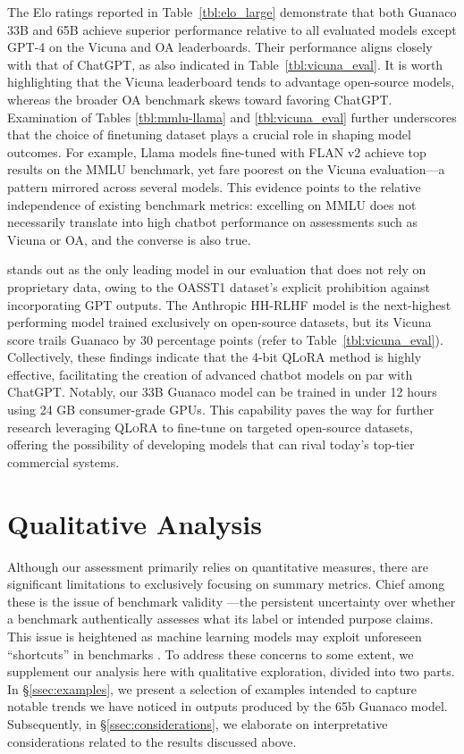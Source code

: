 The Elo ratings reported in Table~\ref{tbl:elo_large} demonstrate that both {Guanaco} 33B and 65B achieve superior performance relative to all evaluated models except GPT-4 on the Vicuna and OA leaderboards. Their performance aligns closely with that of ChatGPT, as also indicated in Table~\ref{tbl:vicuna_eval}. It is worth highlighting that the Vicuna leaderboard tends to advantage open-source models, whereas the broader OA benchmark skews toward favoring ChatGPT. Examination of Tables \ref{tbl:mmlu-llama} and \ref{tbl:vicuna_eval} further underscores that the choice of finetuning dataset plays a crucial role in shaping model outcomes. For example, Llama models fine-tuned with FLAN v2 achieve top results on the MMLU benchmark, yet fare poorest on the Vicuna evaluation—a pattern mirrored across several models. This evidence points to the relative independence of existing benchmark metrics: excelling on MMLU does not necessarily translate into high chatbot performance on assessments such as Vicuna or OA, and the converse is also true.

 stands out as the only leading model in our evaluation that does not rely on proprietary data, owing to the OASST1 dataset's explicit prohibition against incorporating GPT outputs. The Anthropic HH-RLHF model is the next-highest performing model trained exclusively on open-source datasets, but its Vicuna score trails {Guanaco} by 30 percentage points (refer to Table~\ref{tbl:vicuna_eval}). Collectively, these findings indicate that the 4-bit \textsc{QLoRA} method is highly effective, facilitating the creation of advanced chatbot models on par with ChatGPT. Notably, our 33B {Guanaco} model can be trained in under 12 hours using 24 GB consumer-grade GPUs. This capability paves the way for further research leveraging \textsc{QLoRA} to fine-tune on targeted open-source datasets, offering the possibility of developing models that can rival today's top-tier commercial systems.

\section{Qualitative Analysis}

Although our assessment primarily relies on quantitative measures, there are significant limitations to exclusively focusing on summary metrics. Chief among these is the issue of benchmark validity \citep{liao2021we}—the persistent uncertainty over whether a benchmark authentically assesses what its label or intended purpose claims. This issue is heightened as machine learning models may exploit unforeseen ``shortcuts'' in benchmarks \citep{gururangan2018annotation, poliak2018hypothesis}. To address these concerns to some extent, we supplement our analysis here with qualitative exploration, divided into two parts. In \S\ref{ssec:examples}, we present a selection of examples intended to capture notable trends we have noticed in outputs produced by the 65b {Guanaco} model. Subsequently, in \S\ref{ssec:considerations}, we elaborate on interpretative considerations related to the results discussed above.

